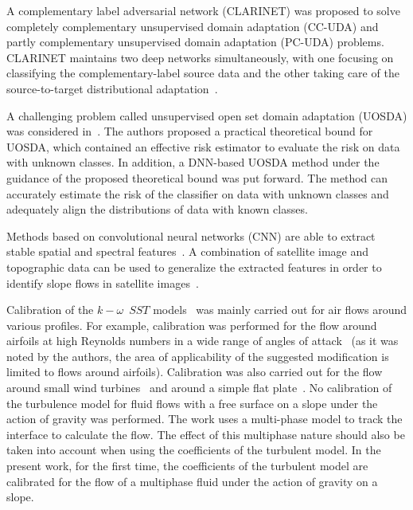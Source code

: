 \documentclass[mathematics,article,accept,pdftex,moreauthors]{Definitions/mdpi}
\begin{document}
A complementary label adversarial network (CLARINET) was proposed to solve completely complementary unsupervised domain adaptation (CC-UDA) and partly complementary unsupervised domain adaptation (PC-UDA) problems. CLARINET maintains two deep networks simultaneously, with one focusing on classifying the complementary-label source data and the other taking care of the source-to-target distributional adaptation~\cite{ZhangLiuFang2021}. 

A challenging problem called unsupervised open set domain adaptation (UOSDA) was considered in~\cite{ZhongFangLiu2021}. The authors proposed a practical theoretical bound for UOSDA, which contained an effective risk estimator to evaluate the risk on data with unknown classes. In addition, a DNN-based UOSDA method under the guidance of the proposed theoretical bound was put forward. The method can accurately estimate the risk of the classifier on data with unknown classes and adequately align the distributions of data with known classes.


Methods based on convolutional neural networks (CNN) are able to extract stable spatial and spectral features~\cite{Maggiori2017}. A combination of satellite image and topographic data can be used to generalize the extracted features in order to identify slope flows in satellite images~\cite{Qin2021, Prakash2021}.

Calibration of the $k{-}\omega$~$SST$ models~\cite{Menter1993, Menter1994, MenterKuntzLangtry2003} was mainly carried out for air flows around various profiles. For example, calibration was performed for the flow around airfoils at high Reynolds numbers in a wide range of angles of attack~\cite{MatyushenkoGarbaruk2016} (as it was noted by the authors, the area of applicability of the suggested modification is limited to flows around airfoils). Calibration was also carried out for the flow around small wind turbines~\cite{rocha2016case, rocha2014} and around a simple flat plate~\cite{kalitzin2016improvements}. 
No calibration of the turbulence model for fluid flows with a free surface on a slope under the action of gravity was performed. The work uses a multi-phase model to track the interface to calculate the flow. The effect of this multiphase nature should also be taken into account when using the coefficients of the turbulent model. In the present work, for the first time, the coefficients of the turbulent model are calibrated for the flow of a multiphase fluid under the action of gravity on a slope.
\end{document}

